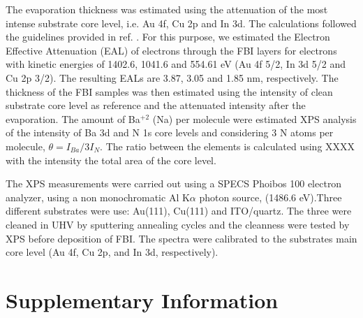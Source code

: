 \documentclass[aps,prl,reprint,longbibliography,superscriptaddress]{revtex4-1}
\def\Ba{Ba$^{+2}$ }
\begin{document}
The evaporation thickness was estimated using the attenuation of the most intense substrate core level, i.e. Au 4f, Cu 2p and In 3d. The calculations followed the guidelines provided in ref. \cite{powell_practical_2020}. For this purpose, we estimated the Electron Effective Attenuation (EAL) of electrons through the FBI layers for electrons with kinetic energies of 1402.6, 1041.6 and 554.61 eV (Au 4f 5/2, In 3d 5/2 and Cu 2p 3/2). The resulting EALs are 3.87, 3.05 and 1.85 nm, respectively. The thickness of the FBI samples was then estimated using the intensity of clean substrate core level as reference and the attenuated intensity after the evaporation.  The amount of \Ba (Na) per molecule were estimated XPS analysis  of the  intensity  of  Ba 3d  and  N 1s  core  levels  and considering 3 N atoms per molecule, $\theta=I_{Ba}/3I_N $.
The ratio between the elements is calculated using XXXX with the intensity the total area of the core level. 

The XPS measurements were carried out using a SPECS Phoibos 100 electron analyzer, using a non monochromatic Al K$\alpha$ photon source, (1486.6 eV).Three different substrates were use: Au(111), Cu(111) and  ITO/quartz. The three were cleaned in UHV by sputtering annealing cycles and the cleanness were tested by XPS before deposition of FBI. The spectra were calibrated to the substrates main core level (Au 4f, Cu 2p, and In 3d, respectively). 

 



\section{Supplementary Information}
\end{document}
